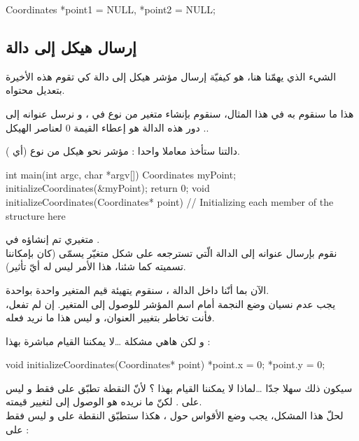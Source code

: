 \begin{Csource}
Coordinates *point1 = NULL, *point2 = NULL;
\end{Csource}

\subsection{إرسال هيكل إلى دالة}

الشيء الذي يهمّنا هنا، هو كيفيّة إرسال مؤشر هيكل إلى دالة كي تقوم هذه الأخيرة بتعديل محتواه.

هذا ما سنقوم به في هذا المثال، سنقوم بإنشاء متغير من نوع
في
،
و نرسل عنوانه إلى
.
دور هذه الدالة هو إعطاء القيمة 0 لعناصر الهيكل.

دالتنا
ستأخذ معاملا واحدا : مؤشر نحو هيكل من نوع
(أي
).

\begin{Csource}
int main(int argc, char *argv[])
{
	Coordinates myPoint;
	initializeCoordinates(&myPoint);
	 return 0;
}
void initializeCoordinates(Coordinates* point)
{
	// Initializing each member of the structure here
}
\end{Csource}

متغيري
تم إنشاؤه في
.\\
نقوم بإرسال عنوانه إلى الدالة
الّتي تسترجعه على شكل متغيّر يسمّى
(كان بإمكاننا تسميته كما شئنا، هذا الأمر ليس له أيّ تأثير).

الآن بما أنّنا داخل الدالة
،
سنقوم يتهيئة قيم المتغير
واحدة بواحدة.\\
يجب عدم نسيان وضع النجمة أمام اسم المؤشر للوصول إلى المتغير. إن لم تفعل، فأنت تخاطر بتغيير العنوان، و ليس هذا ما نريد فعله.

و لكن هاهي مشكلة \dots لا يمكننا القيام مباشرة بهذا :

\begin{Csource}
void initializeCoordinates(Coordinates* point)
{
	*point.x = 0;
	*point.y = 0;
}
\end{Csource}

سيكون ذلك سهلا جدّا \dots لماذا لا يمكننا القيام بهذا ؟
لأنّ النقطة تطبّق على
فقط و ليس على
.
لكنّ ما نريده هو الوصول إلى
لتغيير قيمته.\\
لحلّ هذا المشكل، يجب وضع الأقواس حول
،
هكذا ستطبّق النقطة على
و ليس فقط على
 :

